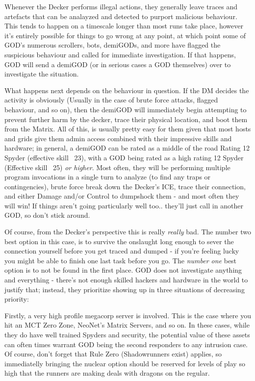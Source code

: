 \begin{multicols*}{3}
	Whenever the Decker performs illegal actions, they generally leave traces and artefacts that can be analayzed and detected to purport malicious behaviour. This tends to happen on a timescale longer than most runs take place, however it's entirely possible for things to go wrong at any point, at which point some of GOD's numerous scrollers, bots, demiGODs, and more have flagged the suspicious behaviour and called for immediate investigation. If that happens, GOD will send a demiGOD (or in serious cases a GOD themselves) over to investigate the situation.
	
	What happens next depends on the behaviour in question. If the DM decides the activity is obviously (Usually in the case of brute force attacks, flagged behaviour, and so on), then the demiGOD will immediately begin attempting to prevent further harm by the decker, trace their physical location, and boot them from the Matrix. All of this, is usually pretty easy for them given that most hosts and grids give them admin access combined with their impressive skills and hardware; in general, a demiGOD can be rated as a middle of the road Rating 12 Spyder (effective skill ~23), with a GOD being rated as a high rating 12 Spyder (Effective skill ~25) \textit{or higher}. Most often, they will be performing multiple program invocations in a single turn to analyze (to find any traps or contingencies), brute force break down the Decker's ICE, trace their connection, and either Damage and/or Control to dumpshock them - and most often they will win! If things aren't going particularly well too.. they'll just call in another GOD, so don't stick around.
	
	Of course, from the Decker's perspective this is really \textit{really} bad. The number two best option in this case, is to survive the onslaught long enough to sever the connection yourself before you get traced and dumped - if you're feeling lucky you might be able to finish one last task before you go. The \textit{number one} best option is to not be found in the first place. GOD does not investigate anything and everything - there's not enough skilled hackers and hardware in the world to justify that; instead, they prioritize showing up in three situations of decreasing priority: 
	
	Firstly, a very high profile megacorp server is involved. This is the case where you hit an MCT Zero Zone, NeoNet's Matrix Servers, and so on. In these cases, while they do have well trained Spyders and security, the potential value of these assets can often times warrant GOD being the second responders to any intrusion case. Of course, don't forget that Rule Zero (Shadowrunners exist) applies, so immediatelly bringing the nuclear option should be reserved for levels of play so high that the runners are making deals with dragons on the regular.
	

\end{multicols*}
